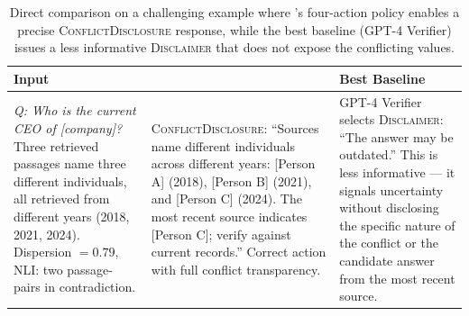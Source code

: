 \begin{table}[t]
\centering
\small
\begin{tabular}{p{3.0cm}p{2.8cm}p{2.8cm}}
\toprule
Input & \method{} & Best Baseline \\
\midrule
\emph{Q: Who is the current CEO of [company]?} Three retrieved passages name three different individuals, all retrieved from different years (2018, 2021, 2024). Dispersion $= 0.79$, NLI: two passage-pairs in contradiction. & \textsc{ConflictDisclosure}: ``Sources name different individuals across different years: [Person A] (2018), [Person B] (2021), and [Person C] (2024). The most recent source indicates [Person C]; verify against current records.'' Correct action with full conflict transparency. & GPT-4 Verifier selects \textsc{Disclaimer}: ``The answer may be outdated.'' This is less informative --- it signals uncertainty without disclosing the specific nature of the conflict or the candidate answer from the most recent source. \\
\bottomrule
\end{tabular}
\caption{Direct comparison on a challenging example where \method{}'s four-action policy enables a precise \textsc{ConflictDisclosure} response, while the best baseline (GPT-4 Verifier) issues a less informative \textsc{Disclaimer} that does not expose the conflicting values.}
\label{tab:qual-comparison}
\end{table}

